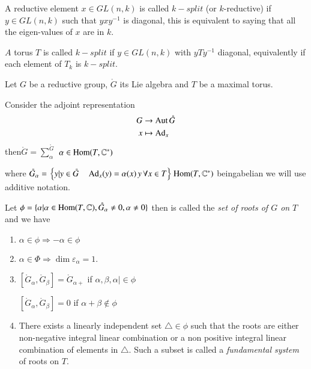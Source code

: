 \begin{defis*}
  A reductive element $x \in G L (n, k)$ is called $k-split$ (or
  $k$-reductive) if $y \in GL (n, k)$ such that $y xy^{-1}$ is
  diagonal, this is equivalent to saying that all the eigen-values of
  $x$ are in $k$. 
\end{defis*}

$A$ torus $T$ is called $k-split$ if $y \in GL (n, k)$ with $yT
y^{-1}$ diagonal, equivalently if each element of $T_k$ is $k-split$.

Let $G$ be a reductive group, $\ring{G}$ its Lie algebra and $T$ be a
maximal torus.

Consider the adjoint representation
\begin{align*}
  G & \to \Aut \ring{G}\\
  x & \mapsto \Ad_x
\end{align*}
then\pageoriginale  $\ring{G} = \sum^{\ring{G}}_\alpha$ \quad $\alpha
\in \operatorname{Hom} (T, \mathbb{C}^*)$

\noindent where $\ring{G}_\alpha = \left\{ y | y
\in \ring{G} \quad \Ad_x (y) = \alpha (x) \,y\, \forall x \in T
\right\} \Hom (T, \mathbb{C}^*)$ being\break abelian we will use additive
notation.

\begin{thm}\label{chap0:thm0.9} %
  Let $\phi = \{ \alpha | \alpha \in \Hom (T, \mathbb{C}),
  \ring{G}_\alpha \neq 0, \alpha \neq 0 \}$ then is called the
  \textit{set of roots of $G$ on} $T$ and we have 
  \begin{enumerate}[\rm 1.]
    \item $\alpha \in \phi \Rightarrow - \alpha \in
      \phi$
      \item $\alpha \in \Phi \Rightarrow \dim
        \varepsilon_\alpha =1$.
        \item $\left[\ring{G}_\alpha, \ring{G}_\beta \right]=
          \ring{G}_{\alpha +}$ if $\alpha, \beta, \alpha |\in \phi$
          
          $\left[\ring{G}_\alpha, \ring{G}_\beta \right]= 0$
          if $\alpha + \beta \notin \phi$
          \item There exists a linearly independent set $\triangle
            \in \phi$ such that the roots are either
            non-negative integral linear combination or a non positive
            integral linear combination of elements in
            $\triangle$. Such a subset is called a \textit{fundamental
              system} of roots on $T$.
  \end{enumerate}
\end{thm}

